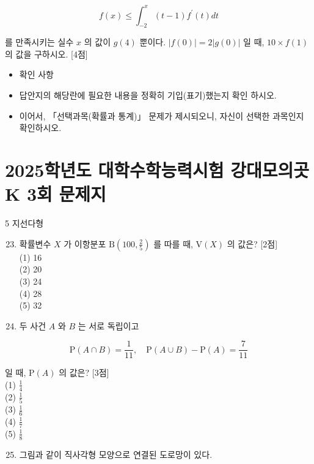 \documentclass[10pt]{article}
\begin{document}
\[
f(x) \leq \int_{-2}^{x}(t-1) f^{\prime}(t) d t
\]

를 만족시키는 실수 \(x\) 의 값이 \(g(4)\) 뿐이다. \(|f(0)|=2|g(0)|\) 일 때, \(10 \times f(1)\) 의 값을 구하시오. [4점]

\begin{itemize}
  \item 확인 사항
\end{itemize}

\begin{itemize}
  \item 답안지의 해당란에 필요한 내용을 정확히 기입(표기)했는지 확인 하시오.

  \item 이어서, 「선택과목(확률과 통계)」 문제가 제시되오니, 자신이 선택한 과목인지 확인하시오.

\end{itemize}

\section*{2025학년도 대학수학능력시험 강대모의곳K 3회 문제지}
5 지선다형

\begin{enumerate}
  \setcounter{enumi}{22}
  \item 확률변수 \(X\) 가 이항분포 \(\mathrm{B}\left(100, \frac{2}{5}\right)\) 를 따를 때, \(\mathrm{V}(X)\) 의 값은? [2점]\\
(1) 16\\
(2) 20\\
(3) 24\\
(4) 28\\
(5) 32

  \item 두 사건 \(A\) 와 \(B\) 는 서로 독립이고

\end{enumerate}

\[
\mathrm{P}(A \cap B)=\frac{1}{11}, \quad \mathrm{P}(A \cup B)-\mathrm{P}(A)=\frac{7}{11}
\]

일 때, \(\mathrm{P}(A)\) 의 값은? [3점]\\
(1) \(\frac{1}{4}\)\\
(2) \(\frac{1}{5}\)\\
(3) \(\frac{1}{6}\)\\
(4) \(\frac{1}{7}\)\\
(5) \(\frac{1}{8}\)

\begin{enumerate}
  \setcounter{enumi}{24}
  \item 그림과 같이 직사각형 모양으로 연결된 도로망이 있다.
\end{enumerate}
\end{document}
